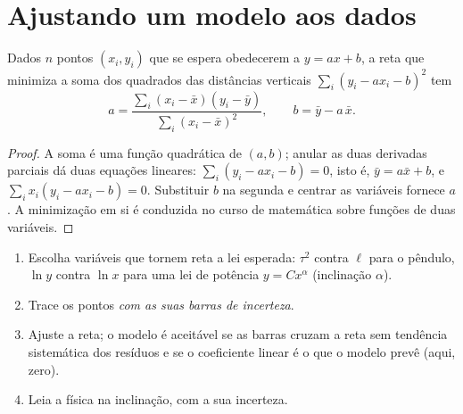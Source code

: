 \section{Ajustando um modelo aos dados}

\begin{proposition}\label{prop:b1:units-dimensions:regression}
Dados $n$ pontos $(x_i, y_i)$ que se espera obedecerem a $y = a x + b$, a
reta que minimiza a soma dos quadrados das distâncias verticais
$\sum_i (y_i - a x_i - b)^2$ tem
\[
a = \frac{\sum_i (x_i - \bar x)(y_i - \bar y)}{\sum_i (x_i - \bar x)^2},
\qquad
b = \bar y - a\,\bar x .
\]
\end{proposition}

\begin{proof}
A soma é uma função quadrática de $(a, b)$; anular as duas derivadas
parciais dá duas equações lineares: $\sum_i (y_i - ax_i - b) = 0$,
isto é, $\bar y = a \bar x + b$, e $\sum_i x_i (y_i - ax_i - b) = 0$.
Substituir $b$ na segunda e centrar as variáveis fornece $a$.
A minimização em si é conduzida no curso de matemática sobre funções de
duas variáveis.
\end{proof}

\begin{method}\label{met:b1:units-dimensions:fit}
\begin{enumerate}
  \item Escolha variáveis que tornem reta a lei esperada:
        $\tau^2$ contra $\ell$ para o pêndulo, $\ln y$ contra
        $\ln x$ para uma lei de potência $y = Cx^\alpha$ (inclinação $\alpha$).
  \item Trace os pontos \emph{com as suas barras de incerteza}.
  \item Ajuste a reta; o modelo é aceitável se as barras cruzam a reta sem
        tendência sistemática dos resíduos e se o coeficiente linear é o
        que o modelo prevê (aqui, zero).
  \item Leia a física na inclinação, com a sua incerteza.
\end{enumerate}
\end{method}

